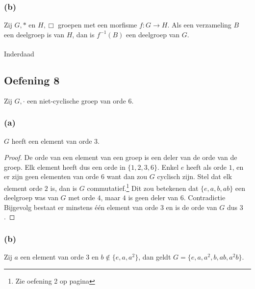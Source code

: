 \documentclass[main.tex]{subfiles}
\begin{document}
\subsubsection*{(b)}
Zij $G,*$ en $H,\Box$ groepen met een morfisme $f: G \rightarrow H$.
Als een verzameling $B$ een deelgroep is van $H$, dan is $f^{-1}(B)$ een deelgroep van $G$.\\\\
Inderdaad

\subsection*{Oefening 8}
\label{oza:oz1-oef8}
Zij $G,\cdot$ een niet-cyclische groep van orde $6$.

\subsubsection*{(a)}
$G$ heeft een element van orde $3$.

\begin{proof}
De orde van een element van een groep is een deler van de orde van de groep.
Elk element heeft dus een orde in $\{ 1, 2, 3, 6 \}$.
Enkel $e$ heeft als orde $1$, en er zijn geen elementen van orde $6$ want dan zou $G$ cyclisch zijn.
Stel dat elk element orde $2$ is, dan is $G$ commutatief.\footnote{Zie oefening 2 op pagina \pageref{oza:oz1-oef2}}
Dit zou betekenen dat $\{ e,a,b,ab \}$ een deelgroep was van $G$ met orde $4$, maar $4$ is geen deler van $6$. Contradictie
Bijgevolg bestaat er minstens \'e\'en element van orde $3$ en is de orde van $G$ dus $3$.

\end{proof}

\subsubsection*{(b)}
Zij $a$ een element van orde $3$ en $b \not\in \{ e,a,a^{2} \}$, dan geldt $G= \{ e,a,a^{2},b,ab,a^{2}b \}$.
\end{document}

